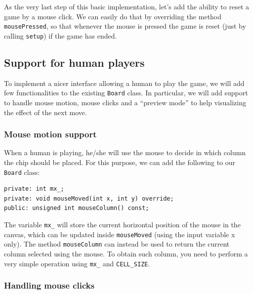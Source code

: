 \documentclass{article}
\begin{document}
As the very last step of this basic implementation, let's add the ability to reset a game by a mouse click. We can easily do that by overriding the method \texttt{mousePressed}, so that whenever the mouse is pressed the game is reset (just by calling \texttt{setup}) if the game has ended.




\subsection{Support for human players}

To implement a nicer interface allowing a human to play the game, we will add few functionalities to the existing \texttt{Board} class. In particular, we will add support to handle mouse motion, mouse clicks and a ``preview mode'' to help visualizing the effect of the next move.


\subsubsection{Mouse motion support}

When a human is playing, he/she will use the mouse to decide in which column the chip should be placed. For this purpose, we can add the following to our \texttt{Board} class:
\begin{center}
\begin{minipage}{.9\textwidth}
\begin{lstlisting}[style=mycpp,numbers=none]
private: int mx_;
private: void mouseMoved(int x, int y) override;
public: unsigned int mouseColumn() const;
\end{lstlisting}
\end{minipage}
\end{center}
The variable \texttt{mx\string_} will store the current horizontal position of the mouse in the canvas, which can be updated inside \texttt{mouseMoved} (using the input variable x only). The method \texttt{mouseColumn} can instead be used to return the current column selected using the mouse. To obtain such column, you need to perform a very simple operation using \texttt{mx\string_} and \texttt{CELL\string_SIZE}.


\subsubsection{Handling mouse clicks}
\end{document}
